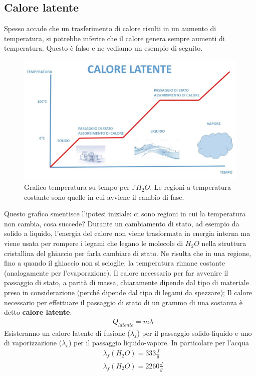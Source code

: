 \documentclass[
10pt, %
a4paper, %
oneside, %
headinclude,footinclude, %
BCOR5mm, %
]{scrartcl}
\begin{document}
\subsection{Calore latente}
Spesso accade che un trasferimento di calore risulti in un aumento di temperatura, si potrebbe inferire che il calore genera sempre aumenti di temperatura. Questo è falso e ne vediamo un esempio di seguito.\\
\begin{figure}[h!]
	\centering
	\includegraphics[width=0.6\linewidth]{"../images/calore specifico acqua(1)"}
	\caption{Grafico temperatura su tempo per l'$H_2 O$. Le regioni a temperatura costante sono quelle in cui avviene il cambio di fase.}
	\label{fig:calore-specifico-acqua1}
\end{figure}
\FloatBarrier
Questo grafico smentisce l'ipotesi iniziale: ci sono regioni in cui la temperatura non cambia, cosa succede? Durante un cambiamento di stato, ad esempio da solido a liquido, l'energia del calore non viene trasformata in energia interna ma viene usata per rompere i legami che legano le molecole di $H_2O$ nella struttura cristallina del ghiaccio per farla cambiare di stato. Ne risulta che in una regione, fino a quando il ghiaccio non si scioglie, la temperatura rimane costante (analogamente per l'evaporazione). Il calore necessario per far avvenire il passaggio di stato, a parità di massa, chiaramente dipende dal tipo di materiale preso in considerazione (perché dipende dal tipo di legami da spezzare);  Il calore necessario per effettuare il passaggio di stato di un grammo di una sostanza è detto \textbf{calore latente}.
\begin{align*} 
	&Q_{latente} = m \lambda
\end{align*} 
Esisteranno un calore latente di fusione ($\lambda_f$) per il passaggio solido-liquido e uno di vaporizzazione ($\lambda_v$) per il passaggio liquido-vapore. In particolare per l'acqua
\begin{align*} 
	&\lambda_f(H_2O) = 333 \frac{J}{g} \\
	&\lambda_f(H_2O) = 2260 \frac{J}{g} 
\end{align*} 
\end{document}

